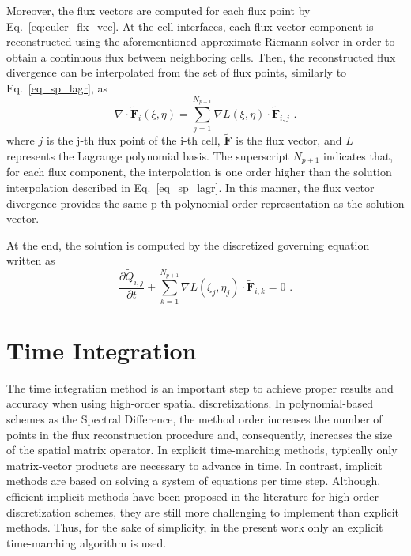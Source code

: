 Moreover, the flux vectors are computed for each flux point by Eq.\ \ref{eq:euler_flx_vec}. At the cell interfaces, each flux vector component is reconstructed using the aforementioned approximate Riemann solver in order to obtain a continuous flux between neighboring cells. Then, the reconstructed flux divergence can be interpolated from the set of flux points, similarly to Eq.\ \ref{eq_sp_lagr}, as
%
\begin{equation}
    \label{eq_fp_lagr}
    \nabla \cdot \tilde{\textbf{F}}_i(\xi, \eta) = \sum_{j=1}^{N_{p+1}}{\nabla L(\xi, \eta) \cdot \tilde{\textbf{F}}_{i,j}}
    \mbox{ .}
\end{equation}
where $j$ is the j-th flux point of the i-th cell, $\tilde{\textbf{F}}$ is the flux vector, and $L$ represents the Lagrange polynomial basis. The superscript $N_{p+1}$ indicates that, for each flux component, the interpolation is one order higher than the solution interpolation described in Eq.\ \ref{eq_sp_lagr}. In this manner, the flux vector divergence provides the same p-th polynomial order representation as the solution vector.

At the end, the solution is computed by the discretized governing equation written as
\begin{equation}
    \label{eq_disc_ge}
    \frac{\partial \tilde{Q}_{i,j}}{\partial t} + \sum_{k=1}^{N_{p+1}}{\nabla L(\xi_j, \eta_j) \cdot \tilde{\textbf{F}}_{i,k}} = 0
    \mbox{ .}
\end{equation}

\section{Time Integration}
The time integration method is an important step to achieve proper results and accuracy when using high-order spatial discretizations. In polynomial-based schemes as the Spectral Difference, the method order increases the number of points in the flux reconstruction procedure and, consequently, increases the size of the spatial matrix operator. In explicit time-marching methods, typically only matrix-vector products are necessary to advance in time. In contrast, implicit methods are based on solving a system of equations per time step. Although, efficient implicit methods have been proposed in the literature \cite{Chen2000} for high-order discretization schemes, they are still more challenging to implement than explicit methods. Thus, for the sake of simplicity, in the present work only an explicit time-marching algorithm is used.

